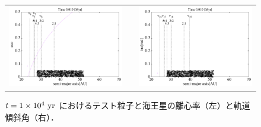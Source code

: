 \documentclass[11pt,a4paper,oneside,onecolumn]{jreport}
\begin{document}
\begin{figure}[H]
\begin{tabular}{ccc}
\begin{minipage}[t]{0.45\hsize}
\centering
\includegraphics[width=8cm]{./image/kuiper_ecc_10kyr.pdf}
\end{minipage} &
\begin{minipage}[t]{0.1\hsize}
\end{minipage} &
\begin{minipage}[t]{0.45\hsize}
\centering
\includegraphics[width=8cm]{./image/kuiper_inc_10kyr.pdf}
\end{minipage}\\
%
\end{tabular}
\caption{$t = 1 \times 10^4\ {\rm yr}$ におけるテスト粒子と海王星の離心率（左）と軌道傾斜角（右）．\label{fig:kuiper_ecc_inc_10kyr}}
\end{figure}
\end{document}
